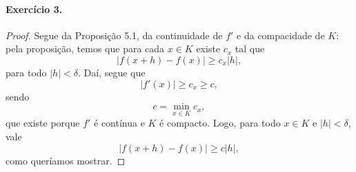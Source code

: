 \documentclass[12pt,a4paper]{article}
\begin{document}
\paragraph{Exercício 3.}
    \begin{proof}
        Segue da Proposição 5.1, da continuidade de $f'$ e da compacidade de $K$:
        pela proposição, temos que para cada $x\in K$ existe $c_x$ tal que
        \begin{equation*}
            |f(x+h) - f(x)| \geq c_x|h|,
        \end{equation*}
        para todo $|h|<\delta$. Daí, segue que
        \begin{equation*}
            |f'(x)| \geq c_x \geq c,
        \end{equation*}
        sendo
        \begin{equation*}
            c = \min_{x\in K} c_x,
        \end{equation*}
        que existe porque $f'$ é contínua e $K$ é compacto. Logo, para todo $x\in K$
        e $|h| < \delta$, vale
        \begin{equation*}
            |f(x+h) - f(x)| \geq c|h|,
        \end{equation*}
        como queríamos mostrar.
    \end{proof}
\end{document}
